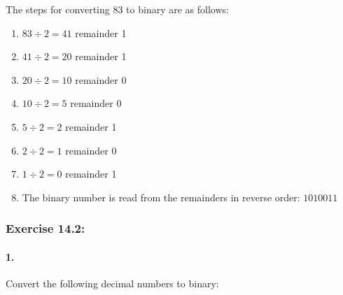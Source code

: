 \documentclass{article}
\begin{document}
\noindent The steps for converting 83 to binary are as follows:

\begin{enumerate}
    \item $83 \div 2 = 41$ remainder 1
    \item $41 \div 2 = 20$ remainder 1
    \item $20 \div 2 = 10$ remainder 0
    \item $10 \div 2 = 5$ remainder 0
    \item $5 \div 2 = 2$ remainder 1
    \item $2 \div 2 = 1$ remainder 0
    \item $1 \div 2 = 0$ remainder 1
    \item The binary number is read from the remainders in reverse order: $1010011$
\end{enumerate}

\vspace*{0.5cm}


\newpage

\subsubsection*{Exercise 14.2:} 
\vspace*{0.25cm}

\paragraph*{1.}
Convert the following decimal numbers to binary:
\end{document}
